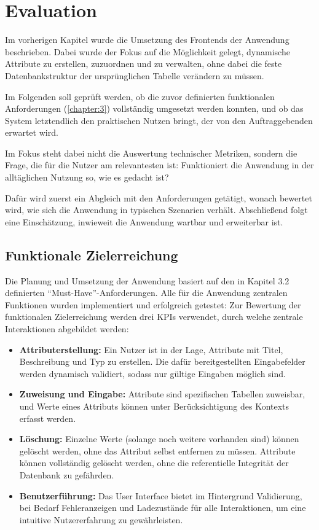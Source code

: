 \section{Evaluation}
Im vorherigen Kapitel wurde die Umsetzung des Frontends der Anwendung beschrieben. Dabei wurde der Fokus auf die Möglichkeit gelegt, dynamische Attribute 
zu erstellen, zuzuordnen und zu verwalten, ohne dabei die feste Datenbankstruktur der ursprünglichen Tabelle verändern zu müssen.

Im Folgenden soll geprüft werden, ob die zuvor definierten funktionalen Anforderungen (\ref*{chapter:3}) vollständig umgesetzt werden konnten, und ob das System 
letztendlich den praktischen Nutzen bringt, der von den Auftraggebenden erwartet wird. 

Im Fokus steht dabei nicht die Auswertung technischer Metriken, sondern die Frage, die für die Nutzer am relevantesten ist: 
Funktioniert die Anwendung in der alltäglichen Nutzung so, wie es gedacht ist?

Dafür wird zuerst ein Abgleich mit den Anforderungen getätigt, wonach bewertet wird, wie sich die Anwendung in typischen Szenarien verhält.
Abschließend folgt eine Einschätzung, inwieweit die Anwendung wartbar und erweiterbar ist.
\subsection{Funktionale Zielerreichung}
Die Planung und Umsetzung der Anwendung basiert auf den in Kapitel 3.2 definierten \enquote{Must-Have}-Anforderungen. Alle für die Anwendung zentralen 
Funktionen wurden implementiert und erfolgreich getestet:
Zur Bewertung der funktionalen Zielerreichung werden drei KPIs verwendet, durch welche zentrale Interaktionen abgebildet werden:
\begin{itemize}
    \item \textbf{Attributerstellung:} Ein Nutzer ist in der Lage, Attribute mit Titel, Beschreibung und Typ zu erstellen. Die dafür bereitgestellten 
    Eingabefelder werden dynamisch validiert, sodass nur gültige Eingaben möglich sind.
    \item \textbf{Zuweisung und Eingabe:} Attribute sind spezifischen Tabellen zuweisbar, und Werte eines Attributs können unter Berücksichtigung des Kontexts 
    erfasst werden.
    \item \textbf{Löschung:} Einzelne Werte (solange noch weitere vorhanden sind) können gelöscht werden, ohne das Attribut selbst entfernen zu müssen.
    Attribute können vollständig gelöscht werden, ohne die referentielle Integrität der Datenbank zu gefährden.
    \item \textbf{Benutzerführung:} Das User Interface bietet im Hintergrund Validierung, bei Bedarf Fehleranzeigen und Ladezustände für alle Interaktionen,
    um eine intuitive Nutzererfahrung zu gewährleisten.
\end{itemize}

